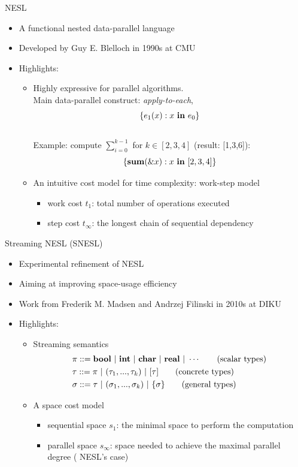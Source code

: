 \documentclass{beamer}
\begin{document}
\begin{frame}{NESL}
	\begin{itemize}
		\item A functional nested data-parallel language
		\item Developed by Guy E. Blelloch in 1990s at CMU
		\item Highlights: 
		\begin{itemize}
			\item Highly expressive for parallel algorithms. \\ 
			Main data-parallel construct: \emph{apply-to-each}, $$\{e_1(x) : x \ \mathbf{in} \ e_0 \} $$\\ 
	  Example: compute $\sum_{i=0}^{k-1}$ for $k \in [2,3,4]$ (result: [1,3,6]):
	  $$\{\*{sum}(\&x) : x \ \*{in} \ [2,3,4]\} $$
	  
	  \item An intuitive cost model for time complexity: work-step model
	  \begin{itemize}
	  	\item work cost $t_1$: total number of operations executed
	  	\item step cost $t_\infty$: the longest chain of sequential dependency
	  \end{itemize}
	\end{itemize}
	\end{itemize}
  
\end{frame}

\begin{frame}{Streaming NESL (SNESL)}
	\begin{itemize}
		\item Experimental refinement of NESL
		\item Aiming at improving space-usage efficiency 
		\item Work from Frederik M. Madsen and Andrzej Filinski in 2010s at DIKU
		\item Highlights:
		\begin{itemize}
			\item Streaming semantics 
			\begin{align*} 
			& \pi ::= \bool \ | \ \int \ | \ \*{char} \ | \ \*{real}  \ | \ \cdots \tag{scalar types}\\
			& \tau ::= \pi \ | \ (\tau_1,...,\tau_k) \ | \ [\tau] \tag{concrete types} \\
			& \sigma ::= \tau \ | \ (\sigma_1,...,\sigma_k) \ | \ \tseq{\sigma}  \tag{general types} 
			\end{align*}
			
			\item A space cost model
			\begin{itemize}
				\item sequential space $s_1$: the minimal space to perform the computation
				\item parallel space $s_\infty$: space needed to achieve the maximal parallel degree ( NESL's case)
			\end{itemize}
		\end{itemize}
	\end{itemize}
\end{frame}
\end{document}
